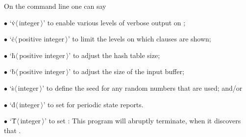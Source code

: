 On the command line one can say
\smallskip
\item{$\bullet$}
`\.v$\langle\,$integer$\,\rangle$' to enable various levels of verbose
output on ;
\item{$\bullet$}
`\.c$\langle\,$positive integer$\,\rangle$' to limit the levels on which
clauses are shown;
\item{$\bullet$}
`\.h$\langle\,$positive integer$\,\rangle$' to adjust the hash table size;
\item{$\bullet$}
`\.b$\langle\,$positive integer$\,\rangle$' to adjust the size of the input
buffer;
\item{$\bullet$}
`\.s$\langle\,$integer$\,\rangle$' to define the seed for any random numbers
that are used; and/or
\item{$\bullet$}
`\.d$\langle\,$integer$\,\rangle$' to set  for periodic state
reports.
\item{$\bullet$}
`\.T$\langle\,$integer$\,\rangle$' to set : This program will
abruptly terminate, when it discovers that .

